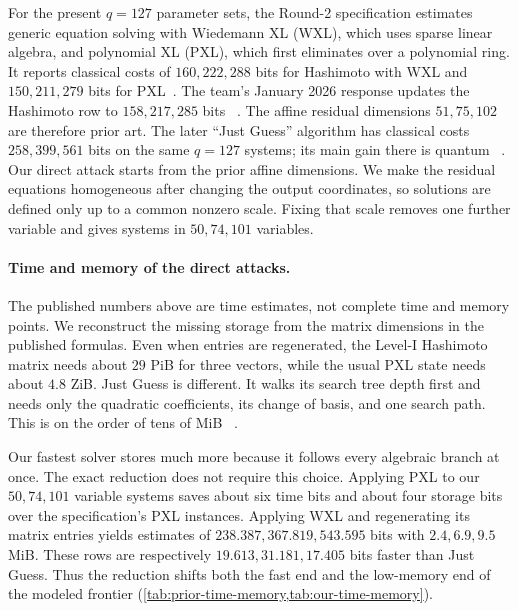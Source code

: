 \documentclass[11pt,a4paper]{article}
\theoremstyle{definition}
\theoremstyle{remark}
\begin{document}
For the present $q=127$ parameter sets, the Round-2 specification estimates
generic equation solving with Wiedemann XL (WXL), which uses sparse linear
algebra, and polynomial XL (PXL), which first eliminates over a polynomial
ring.  It reports classical costs of $160,222,288$ bits for Hashimoto with WXL
and $150,211,279$ bits for PXL~\cite{QRUOVSpec}.  The team's January 2026 response
updates the Hashimoto row to $158,217,285$ bits
~\cite{QRUOVResponse2026}.  The affine residual dimensions $51,75,102$ are
therefore prior art.  The later ``Just Guess'' algorithm has classical costs
$258,399,561$ bits on the same $q=127$ systems; its main gain there is quantum
~\cite{JustGuess,GeneralizedPartition}.  Our direct attack starts from the prior affine dimensions.
We make the residual equations homogeneous after changing the output
coordinates, so solutions are defined only up to a common nonzero scale.
Fixing that scale removes one further variable and gives systems in
$50,74,101$ variables.

\paragraph{Time and memory of the direct attacks.}
The published numbers above are time estimates, not complete time and memory
points.  We reconstruct the missing storage from the matrix dimensions in the
published formulas.  Even when entries are regenerated, the Level-I
Hashimoto matrix needs about $29$ PiB for three vectors, while the usual PXL
state needs about $4.8$ ZiB.  Just Guess is different.  It walks its search
tree depth first and needs only the quadratic coefficients, its change of
basis, and one search path.  This is on the order of tens of MiB
~\cite{JustGuess}.

Our fastest solver stores much more because it follows every algebraic branch
at once.  The exact reduction does not require this choice.  Applying PXL to
our $50,74,101$ variable systems saves about six time bits and about four
storage bits over the specification's PXL instances.  Applying WXL and
regenerating its matrix entries yields estimates of $238.387,367.819,543.595$
bits with $2.4,6.9,9.5$ MiB.  These rows are respectively
$19.613,31.181,17.405$ bits faster than Just Guess.  Thus the reduction shifts
both the fast end and the low-memory end of the modeled frontier
(\cref{tab:prior-time-memory,tab:our-time-memory}).
\end{document}

